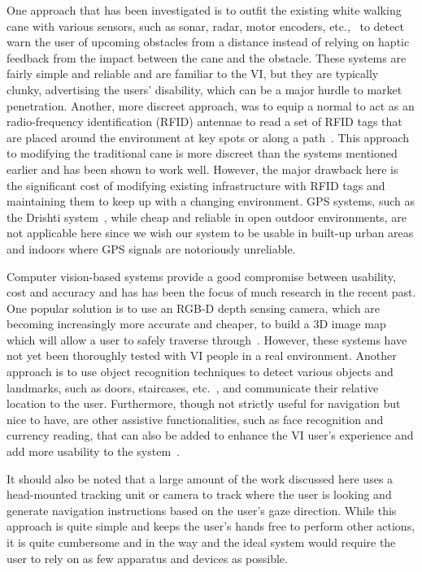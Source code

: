 \documentclass[format=sigconf, review=true, screen=true, anonymous=true]{acmart}
\begin{document}
One approach that has been investigated is to outfit the existing white walking cane with various sensors, such as sonar, radar, motor encoders, etc.,~\cite{ulrich1997, marion2008batcane} to detect warn the user of upcoming obstacles from a distance instead of relying on haptic feedback from the impact between the cane and the obstacle. These systems are fairly simple and reliable and are familiar to the VI, but they are typically clunky, advertising the users' disability, which can be a major hurdle to market penetration. Another, more discreet approach, was to equip a normal to act as an radio-frequency identification (RFID) antennae to read a set of RFID tags that are placed around the environment at key spots or along a path~\cite{faria2010electronic, willis2005}. This approach to modifying the traditional cane is more discreet than the systems mentioned earlier and has been shown to work well. However, the major drawback here is the significant cost of modifying existing infrastructure with RFID tags and maintaining them to keep up with a changing environment. GPS systems, such as the Drishti system~\cite{ran2004drishti}, while cheap and reliable in open outdoor environments, are not applicable here since we wish our system to be usable in built-up urban areas and indoors where GPS signals are notoriously unreliable. 

Computer vision-based systems provide a good compromise between usability, cost and accuracy and has has been the focus of much research in the recent past. One popular solution is to use an RGB-D depth sensing camera, which are becoming increasingly more accurate and cheaper, to build a 3D image map which will allow a user to safely traverse through~\cite{lee2015, rodriguez2012obstacle}. However, these systems have not yet been thoroughly tested with VI people in a real environment. Another approach is to use object recognition techniques to detect various objects and landmarks, such as doors, staircases, etc.~\cite{tian2013b}, and communicate their relative location to the user. Furthermore, though not strictly useful for navigation but nice to have, are other assistive functionalities, such as face recognition and currency reading, that can also be added to enhance the VI user's experience and add more usability to the system~\cite{chessa2016}.

It should also be noted that a large amount of the work discussed here uses a head-mounted tracking unit or camera to track where the user is looking and generate navigation instructions based on the user's gaze direction. While this approach is quite simple and keeps the user's hands free to perform other actions, it is quite cumbersome and in the way and the ideal system would require the user to rely on as few apparatus and devices as possible. 
\end{document}
